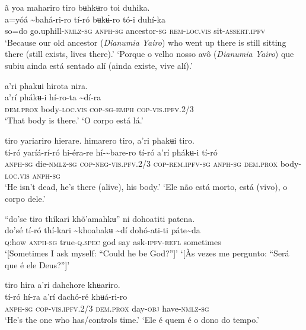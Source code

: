 \documentclass[output=paper,
modfonts,nonflat
]{langsci/langscibook}
\begin{document}
\ea ã yoa mahariro tiro bʉhkʉro toi duhika. \\[.3em]
\gll {\textasciitilde}a=yóá	{\textasciitilde}bahá-ri-ro	tí-ró	bʉkʉ́-ro	tó-i	duhí-ka \\
     so=do	go.uphill\textsc{-nmlz-sg}	\textsc{anph-sg}	ancestor\textsc{-sg}	\textsc{rem-loc.vis}	sit-\textsc{assert.ipfv}\\
\glt ‘Because our old ancestor (\textit{Dianumia Yairo}) who went up there is still sitting there (still exists, lives there).’
\glt ‘Porque o velho nosso avô (\textit{Dianumia Yairo}) que subiu ainda está sentado alí (ainda existe, vive alí).’
\z 

 
\ea a’ri phakʉi hirota nira.  \\[.3em]
\gll a’rí	phákʉ-i	hí-ro-ta	{\textasciitilde}dí-ra \\
     \textsc{dem.prox}	body\textsc{-loc.vis}	\textsc{cop-sg-emph}	\textsc{cop-vis.ipfv.}2/3\\
\glt ‘That body is there.’	
\glt ‘O corpo está lá.’
\z 

\ea tiro yariariro hierare. himarero tiro, a’ri phakʉi tiro.\\[.3em]
\gll  tí-ró	yaríá-rí-ró	hi-éra-re	hí-{\textasciitilde}bare-ro	tí-ró	a’rí	phákʉ-i	tí-ró \\
     \textsc{anph-sg}	die\textsc{-nmlz-sg}	\textsc{cop-neg-vis.pfv.}2/3	\textsc{cop-rem.ipfv-sg}	\textsc{anph-sg}	\textsc{dem.prox}	body\textsc{-loc.vis}	\textsc{anph-sg}\\
\glt ‘He isn't dead, he's there (alive), his body.’
\glt ‘Ele não está morto, está (vivo), o corpo dele.’
\z 

\ea “do'se tiro thíkari khõ'amahkʉ” ni dohoatiti patena. \\[.3em]
\gll do'sé	tí-ró	thí-kari	{\textasciitilde}khoabakʉ	{\textasciitilde}dí	dohó-ati-ti	páte{\textasciitilde}da \\
     \textsc{q:}how	\textsc{anph-sg}	true-\textsc{q.spec}	god	say	ask-\textsc{ipfv-refl}	sometimes\\
\glt ‘[Sometimes I ask myself: “Could he be God?”]’
\glt ‘[Às vezes me pergunto: “Será que é ele Deus?”]’
\z 

\ea tiro hira a’ri dahchore khʉariro. \\[.3em]
\gll tí-ró	hí-ra	a’rí dachó-ré	khʉá-ri-ro \\
     \textsc{anph-sg}	\textsc{cop-vis.ipfv.}2/3	\textsc{dem.prox} day\textsc{-obj}	have\textsc{-nmlz-sg}\\
\glt ‘He's the one who has/controls time.’
\glt ‘Ele é quem é o dono do tempo.’
\z
\end{document}
